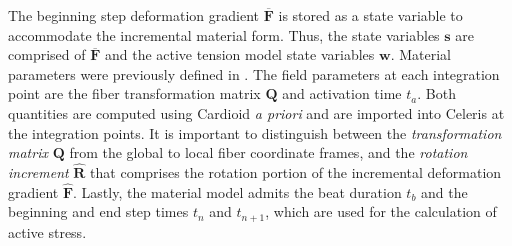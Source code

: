 The beginning step deformation gradient $\overline{\bm{F}}$ is stored as a state variable to accommodate the incremental material form. Thus, the state variables $\bm{s}$ are comprised of $\overline{\bm{F}}$ and the active tension model state variables $\bm{w}$. Material parameters were previously defined in . The field parameters at each integration point are the fiber transformation matrix $\bm{Q}$ and activation time $t_a$. Both quantities are computed using Cardioid \textit{a priori} and are imported into Celeris at the integration points. It is important to distinguish between the \textit{transformation matrix} $\bm{Q}$ from the global to local fiber coordinate frames, and the \textit{rotation increment} $\hat{\bm{R}}$ that comprises the rotation portion of the incremental deformation gradient $\hat{\bm{F}}$. Lastly, the material model admits the beat duration $t_b$ and the beginning and end step times $t_n$ and $t_{n+1}$, which are used for the calculation of active stress.

